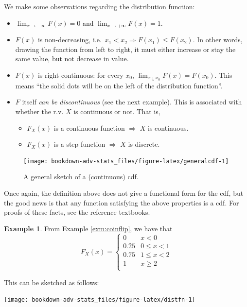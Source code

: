 \documentclass[
]{book}
\providecommand{\tightlist}{%
  \setlength{\itemsep}{0pt}\setlength{\parskip}{0pt}}
\theoremstyle{definition}
\theoremstyle{definition}
\newtheorem{example}{Example}[chapter]
\theoremstyle{definition}
\theoremstyle{definition}
\theoremstyle{remark}
\begin{document}
We make some observations regarding the distribution function:

\begin{itemize}
\tightlist
\item
  \(\lim_{x\to-\infty} F(x) = 0\) and \(\lim_{x\to+\infty} F(x) = 1\).
\item
  \(F(x)\) is non-decreasing, i.e.~\(x_1 < x_2 \Rightarrow F(x_1) \leq F(x_2)\). In other words, drawing the function from left to right, it must either increase or stay the same value, but not decrease in value.
\item
  \(F(x)\) is right-continuous: for every \(x_0\), \(\lim_{x \downarrow x_0} F(x) = F(x_0)\). This means ``the solid dots will be on the left of the distribution function''.
\item
  \(F\) itself \emph{can be discontinuous} (see the next example). This is associated with whether the r.v. \(X\) is continuous or not. That is,

  \begin{itemize}
  \tightlist
  \item
    \(F_X(x)\) is a continuous function \(\Rightarrow\) \(X\) is continuous.
  \item
    \(F_X(x)\) is a step function \(\Rightarrow\) \(X\) is discrete.
  \end{itemize}
\end{itemize}

\begin{figure}

{\centering \texttt{[image: bookdown-adv-stats\_files/figure-latex/generalcdf-1]} 

}

\caption{A general sketch of a (continuous) cdf.}\label{fig:generalcdf}
\end{figure}

Once again, the definition above does not give a functional form for the cdf, but the good news is that any function satisfying the above properties is a cdf. For proofs of these facts, see the reference textbooks.

\begin{example}

From Example \ref{exm:coinflip}, we have that
\[
F_X(x)=
\begin{cases}
0   &x < 0 \\
0.25  &0 \leq x < 1 \\
0.75  &1 \leq x < 2 \\
1  &x \geq 2 \\
\end{cases}
\]

This can be sketched as follows:

\begin{center}\texttt{[image: bookdown-adv-stats\_files/figure-latex/distfn-1]} \end{center}

\end{example}
\end{document}
